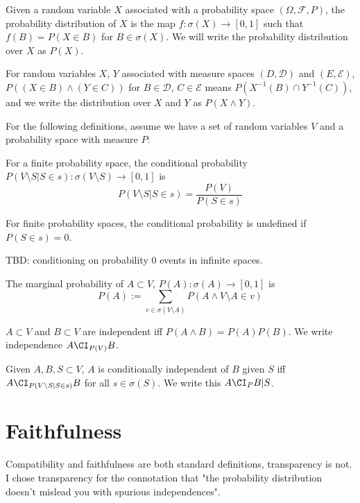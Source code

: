\begin{definition}
Given a random variable $X$ associated with a probability space $(\Omega,\mathcal{F},P)$, the probability distribution of $X$ is the map $f:\sigma(X)\to [0,1]$ such that $f(B)=P(X\in B)$ for $B\in\sigma(X)$. We will write the probability distribution over $X$ as $P(X)$.

For random variables $X$, $Y$ associated with measure spaces $(D,\mathcal{D})$ and $(E,\mathcal{E})$, $P((X\in B)\wedge (Y \in C))$ for $B\in\mathcal{D}$, $C\in\mathcal{E}$ means $P(X^{-1}(B)\cap Y^{-1}(C))$, and we write the distribution over $X$ and $Y$ as $P(X\wedge Y)$.

\end{definition}

For the following definitions, assume we have a set of random variables $V$ and a probability space with measure $P$:

\begin{definition}
For a finite probability space, the conditional probability $P(V\setminus S|S\in s):\sigma(V\setminus S)\to [0,1]$ is \[P(V\setminus S|S\in s)=\frac{P(V)}{P(S\in s)}\]

For finite probability spaces, the conditional probability is undefined if $P(S\in s)=0$.

TBD: conditioning on probability 0 events in infinite spaces.
\end{definition}

\begin{definition}
The marginal probability of $A\subset V$, $P(A):\sigma(A)\to [0,1]$ is \[P(A):=\sum_{v\in \sigma(V\setminus A)} P(A \wedge V\setminus A \in v)\]
\end{definition}

\begin{definition}[Independence]
$A\subset V$ and $B\subset V$ are independent iff $P(A\wedge B)=P(A)P(B)$. We write independence $A\CI_{P(V)} B$.
\end{definition}

\begin{definition}
Given $A, B, S \subset V$, $A$ is conditionally independent of $B$ given $S$ iff $A\CI_{P(V\setminus S|S\in s)} B$ for all $s\in\sigma(S)$. We write this $A\CI_P B | S$.
\end{definition}

\section{Faithfulness}
\begin{remark}
Compatibility and faithfulness are both standard definitions, transparency is not. I chose transparency for the connotation that "the probability distribution doesn't mislead you with spurious independences".
\end{remark}

